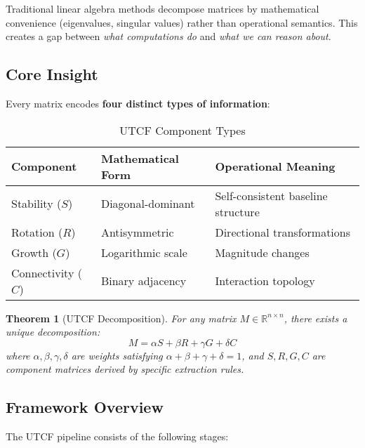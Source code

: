 \documentclass[11pt,a4paper]{article}
\newtheorem{theorem}{Theorem}[section]
\theoremstyle{definition}
\theoremstyle{remark}
\newcommand{\R}{\mathbb{R}}
\begin{document}
Traditional linear algebra methods decompose matrices by mathematical convenience (eigenvalues, singular values) rather than operational semantics. This creates a gap between \textit{what computations do} and \textit{what we can reason about}.

\subsection{Core Insight}

Every matrix encodes \textbf{four distinct types of information}:

\begin{table}[h]
\centering
\begin{tabular}{lll}
\toprule
\textbf{Component} & \textbf{Mathematical Form} & \textbf{Operational Meaning} \\
\midrule
Stability ($S$) & Diagonal-dominant & Self-consistent baseline structure \\
Rotation ($R$) & Antisymmetric & Directional transformations \\
Growth ($G$) & Logarithmic scale & Magnitude changes \\
Connectivity ($C$) & Binary adjacency & Interaction topology \\
\bottomrule
\end{tabular}
\caption{UTCF Component Types}
\label{tab:components}
\end{table}

\begin{theorem}[UTCF Decomposition]\label{thm:decomposition}
For any matrix $M \in \R^{n \times n}$, there exists a unique decomposition:
\begin{equation}
M = \alpha S + \beta R + \gamma G + \delta C
\end{equation}
where $\alpha, \beta, \gamma, \delta$ are weights satisfying $\alpha + \beta + \gamma + \delta = 1$, and $S, R, G, C$ are component matrices derived by specific extraction rules.
\end{theorem}

\subsection{Framework Overview}

The UTCF pipeline consists of the following stages:

\begin{center}
\end{center}
\end{document}

